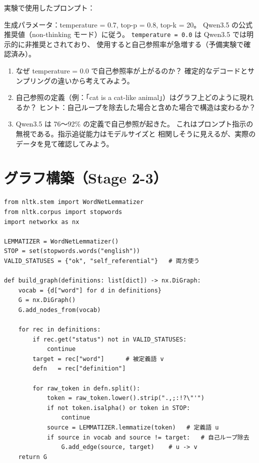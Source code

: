 \documentclass[lang=jp, color=black, mode=simple, 11pt]{elegantbook}
\begin{document}
実験で使用したプロンプト：

\begin{center}
\end{center}

\begin{note}
  生成パラメータ：temperature = 0.7, top-p = 0.8, top-k = 20。
  Qwen3.5 の公式推奨値（non-thinking モード）に従う。
  \texttt{temperature = 0.0} は Qwen3.5 では明示的に非推奨とされており、
  使用すると自己参照率が急増する（予備実験で確認済み）。
\end{note}

\begin{reflect}
\begin{enumerate}
  \item なぜ temperature = 0.0 で自己参照率が上がるのか？
        確定的なデコードとサンプリングの違いから考えてみよう。
  \item 自己参照の定義（例：「cat is a cat-like animal」）はグラフ上どのように現れるか？
        ヒント：自己ループを除去した場合と含めた場合で構造は変わるか？
  \item Qwen3.5 は 76〜92\% の定義で自己参照が起きた。
        これはプロンプト指示の無視である。指示追従能力はモデルサイズと
        相関しそうに見えるが、実際のデータを見て確認してみよう。
\end{enumerate}
\end{reflect}

\section{グラフ構築（Stage 2-3）}

\begin{tryit}[定義文から辺を張る]
\begin{lstlisting}[caption=グラフ構築の核心部分 (graph\_build.py)]
from nltk.stem import WordNetLemmatizer
from nltk.corpus import stopwords
import networkx as nx

LEMMATIZER = WordNetLemmatizer()
STOP = set(stopwords.words("english"))
VALID_STATUSES = {"ok", "self_referential"}   # 両方使う

def build_graph(definitions: list[dict]) -> nx.DiGraph:
    vocab = {d["word"] for d in definitions}
    G = nx.DiGraph()
    G.add_nodes_from(vocab)

    for rec in definitions:
        if rec.get("status") not in VALID_STATUSES:
            continue
        target = rec["word"]      # 被定義語 v
        defn   = rec["definition"]

        for raw_token in defn.split():
            token = raw_token.lower().strip(".,;:!?\"'")
            if not token.isalpha() or token in STOP:
                continue
            source = LEMMATIZER.lemmatize(token)   # 定義語 u
            if source in vocab and source != target:   # 自己ループ除去
                G.add_edge(source, target)    # u -> v
    return G
\end{lstlisting}
\end{tryit}
\end{document}
